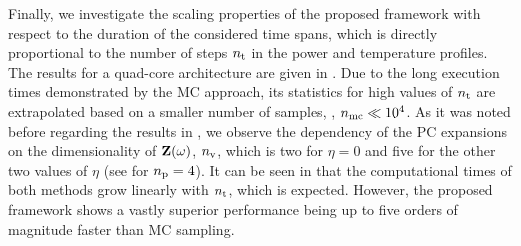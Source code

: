 Finally, we investigate the scaling properties of the proposed framework with respect to the duration of the considered time spans, which is directly proportional to the number of steps ${n_\text{t}}$ in the power and temperature profiles.
The results for a quad-core architecture are given in .
Due to the long execution times demonstrated by the MC approach, its statistics for high values of ${n_\text{t}}$ are extrapolated based on a smaller number of samples, \ie, ${n_\text{mc}} \ll 10^4$.
As it was noted before regarding the results in , we observe the dependency of the PC expansions on the dimensionality of $\mathbf{Z}(\omega)$, ${n_\text{v}}$, which is two for $\eta = 0$ and five for the other two values of $\eta$ (see  for ${n_\text{p}} = 4$).
It can be seen in  that the computational times of both methods grow linearly with ${n_\text{t}}$, which is expected.
However, the proposed framework shows a vastly superior performance being up to five orders of magnitude faster than MC sampling.
